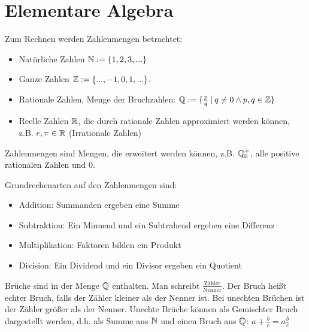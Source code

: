 \section{Elementare Algebra}

\begin{definition}[Zahlenmengen]
	Zum Rechnen werden Zahlenmengen betrachtet:
	\begin{itemize}[noitemsep]
		\item Natürliche Zahlen $\mathbb{N} := \{ 1, 2, 3, ... \}$
		\item Ganze Zahlen $\mathbb{Z} := \{...,-1, 0, 1, ... \}$.
		\item Rationale Zahlen, Menge der Bruchzahlen: $\mathbb{Q} := \{ \frac{p}{q} \medspace | \medspace q \neq 0 \land p,q \in \mathbb{Z} \}$
		\item Reelle Zahlen $\mathbb{R}$, die durch rationale Zahlen approximiert werden können, z.B. $e, \pi \in \mathbb{R}$ (Irrationale Zahlen)
	\end{itemize}
	Zahlenmengen sind Mengen, die erweitert werden können, z.B. $\mathbb{Q}^+_0$, alle positive rationalen Zahlen und $0$.
\end{definition}

\begin{definition}[Grundrechenarten]
	Grundrechenarten auf den Zahlenmengen sind:
	\begin{itemize}[noitemsep]
		\item Addition: Summanden ergeben eine Summe
		\item Subtraktion: Ein Minuend und ein Subtrahend ergeben eine Differenz
		\item Multiplikation: Faktoren bilden ein Produkt
		\item Division: Ein Dividend und ein Divisor ergeben ein Quotient
	\end{itemize}
\end{definition}

\begin{definition}[Brüche]
	Brüche sind in der Menge $\mathbb{Q}$ enthalten. Man schreibt $\frac{\text{Zähler}}{\text{Nenner}}$. Der Bruch heißt echter Bruch, falls der Zähler kleiner als der Nenner ist. Bei unechten Brüchen ist der Zähler größer als der Nenner. Unechte Brüche können als Gemischter Bruch dargestellt werden, d.h. als Summe aus $\mathbb{N}$ und einen Bruch aus $\mathbb{Q}$: $a + \frac{b}{c} = a\frac{b}{c}$
\end{definition}

